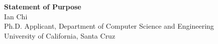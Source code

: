 \documentclass[11pt]{article}
\begin{document}
\begin{center}
    {\Large \textbf{Statement of Purpose}}\\[4pt]
    {\large Ian Chi}\\[2pt]
    Ph.D. Applicant, Department of Computer Science and Engineering\\
    University of California, Santa Cruz
\end{center}

\vspace{1em}

\end{document}
